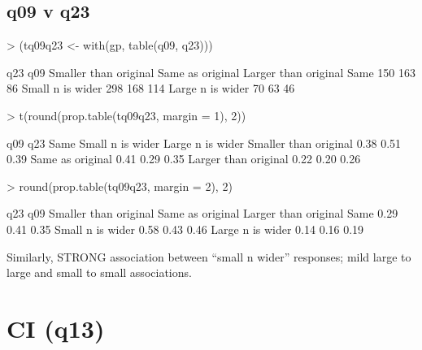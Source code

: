 \documentclass[11pt]{article}
\begin{document}
\subsection{q09 v q23}
\label{sec-3-2}
\begin{Schunk}
\begin{Sinput}
> (tq09q23 <- with(gp, table(q09, q23)))
\end{Sinput}
\begin{Soutput}
                  q23
q09                Smaller than original Same as original Larger than original
  Same                               150              163                   86
  Small n is wider                   298              168                  114
  Large n is wider                    70               63                   46
\end{Soutput}
\begin{Sinput}
> t(round(prop.table(tq09q23, margin = 1), 2))
\end{Sinput}
\begin{Soutput}
                       q09
q23                     Same Small n is wider Large n is wider
  Smaller than original 0.38             0.51             0.39
  Same as original      0.41             0.29             0.35
  Larger than original  0.22             0.20             0.26
\end{Soutput}
\begin{Sinput}
> round(prop.table(tq09q23, margin = 2), 2)
\end{Sinput}
\begin{Soutput}
                  q23
q09                Smaller than original Same as original Larger than original
  Same                              0.29             0.41                 0.35
  Small n is wider                  0.58             0.43                 0.46
  Large n is wider                  0.14             0.16                 0.19
\end{Soutput}
\end{Schunk}





Similarly, STRONG association between ``small n wider'' responses; mild large to large and small to small associations.

\section{CI (q13)}
\label{sec-4}
\end{document}
